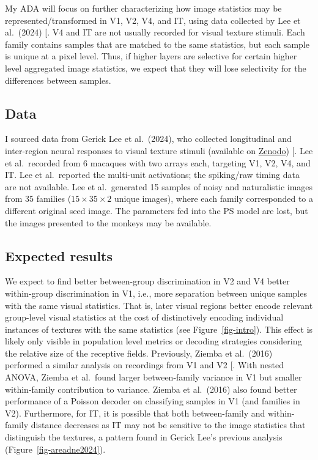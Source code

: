 \documentclass[
  11pt,
  letterpaper,
  DIV=11,
  numbers=noendperiod]{scrartcl}
\begin{document}
My ADA will focus on further characterizing how image statistics may be
represented/transformed in V1, V2, V4, and IT, using data collected by
Lee et al.~(2024) {[}\citeproc{ref-lee_developmentally_2024}{3}{]}. V4
and IT are not usually recorded for visual texture stimuli. Each family
contains samples that are matched to the same statistics, but each
sample is unique at a pixel level. Thus, if higher layers are selective
for certain higher level aggregated image statistics, we expect that
they will lose selectivity for the differences between samples.

\subsection{Data}\label{data}

I sourced data from Gerick Lee et al.~(2024), who collected longitudinal
and inter-region neural responses to visual texture stimuli (available
on \href{https://zenodo.org/records/10888270}{Zenodo})
{[}\citeproc{ref-lee_developmentally_2024}{3}{]}. Lee et al.~recorded
from 6 macaques with two arrays each, targeting V1, V2, V4, and IT. Lee
et al.~reported the multi-unit activations; the spiking/raw timing data
are not available. Lee et al.~generated 15 samples of noisy and
naturalistic images from 35 families (\(15 \times 35 \times 2\) unique
images), where each family corresponded to a different original seed
image. The parameters fed into the PS model are lost, but the images
presented to the monkeys may be available.

\subsection{Expected results}\label{expected-results}

We expect to find better between-group discrimination in V2 and V4
better within-group discrimination in V1, i.e., more separation between
unique samples with the same visual statistics. That is, later visual
regions better encode relevant group-level visual statistics at the cost
of distinctively encoding individual instances of textures with the same
statistics (see Figure~\ref{fig-intro}). This effect is likely only
visible in population level metrics or decoding strategies considering
the relative size of the receptive fields. Previously, Ziemba et
al.~(2016) performed a similar analysis on recordings from V1 and V2
{[}\citeproc{ref-ziemba_selectivity_2016}{4}{]}. With nested ANOVA,
Ziemba et al.~found larger between-family variance in V1 but smaller
within-family contribution to variance. Ziemba et al.~(2016) also found
better performance of a Poisson decoder on classifying samples in V1
(and families in V2). Furthermore, for IT, it is possible that both
between-family and within-family distance decreases as IT may not be
sensitive to the image statistics that distinguish the textures, a
pattern found in Gerick Lee's previous analysis
(Figure~\ref{fig-areadne2024}).
\end{document}
